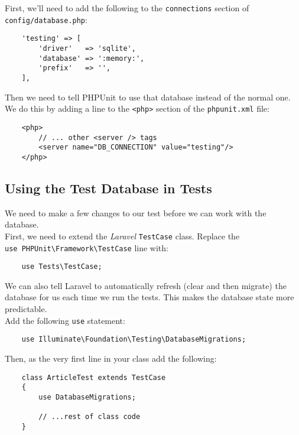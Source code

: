 First, we'll need to add the following to the \texttt{connections} section of \\ \texttt{config/database.php}:

\begin{verbatim}
    'testing' => [
        'driver'   => 'sqlite',
        'database' => ':memory:',
        'prefix'   => '',
    ],
\end{verbatim}

Then we need to tell PHPUnit to use that database instead of the normal one. We do this by adding a line to the \texttt{<php>} section of the \texttt{phpunit.xml} file:

\begin{verbatim}
    <php>
        // ... other <server /> tags
        <server name="DB_CONNECTION" value="testing"/>
    </php>
\end{verbatim}


\subsection{Using the Test Database in Tests}

We need to make a few changes to our test before we can work with the database.
\\

First, we need to extend the \textit{Laravel} \texttt{TestCase} class. Replace the \\ \texttt{use PHPUnit\textbackslash{}Framework\textbackslash{}TestCase} line with:

\begin{verbatim}
    use Tests\TestCase;
\end{verbatim}

We can also tell Laravel to automatically refresh (clear and then migrate) the database for us each time we run the tests. This makes the database state more predictable.
\\

Add the following \texttt{use} statement:

\begin{verbatim}
    use Illuminate\Foundation\Testing\DatabaseMigrations;
\end{verbatim}

Then, as the very first line in your class add the following:

\begin{verbatim}
    class ArticleTest extends TestCase
    {
        use DatabaseMigrations;

        // ...rest of class code
    }
\end{verbatim}

